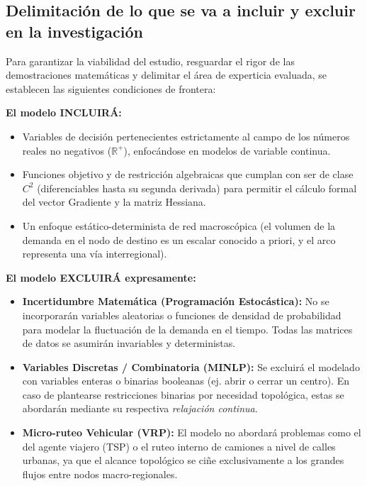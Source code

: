 \subsection{Delimitación de lo que se va a incluir y excluir en la investigación}
Para garantizar la viabilidad del estudio, resguardar el rigor de las demostraciones matemáticas y delimitar el área de experticia evaluada, se establecen las siguientes condiciones de frontera:

\textbf{El modelo INCLUIRÁ:}
\begin{itemize}
    \item Variables de decisión pertenecientes estrictamente al campo de los números reales no negativos ($\mathbb{R}^+$), enfocándose en modelos de variable continua.
    \item Funciones objetivo y de restricción algebraicas que cumplan con ser de clase $C^2$ (diferenciables hasta su segunda derivada) para permitir el cálculo formal del vector Gradiente y la matriz Hessiana.
    \item Un enfoque estático-determinista de red macroscópica (el volumen de la demanda en el nodo de destino es un escalar conocido a priori, y el arco representa una vía interregional).
\end{itemize}

\textbf{El modelo EXCLUIRÁ expresamente:}
\begin{itemize}
    \item \textbf{Incertidumbre Matemática (Programación Estocástica):} No se incorporarán variables aleatorias o funciones de densidad de probabilidad para modelar la fluctuación de la demanda en el tiempo. Todas las matrices de datos se asumirán invariables y deterministas.
    \item \textbf{Variables Discretas / Combinatoria (MINLP):} Se excluirá el modelado con variables enteras o binarias booleanas (ej. abrir o cerrar un centro). En caso de plantearse restricciones binarias por necesidad topológica, estas se abordarán mediante su respectiva \textit{relajación continua}.
    \item \textbf{Micro-ruteo Vehicular (VRP):} El modelo no abordará problemas como el del agente viajero (TSP) o el ruteo interno de camiones a nivel de calles urbanas, ya que el alcance topológico se ciñe exclusivamente a los grandes flujos entre nodos macro-regionales.
\end{itemize}
